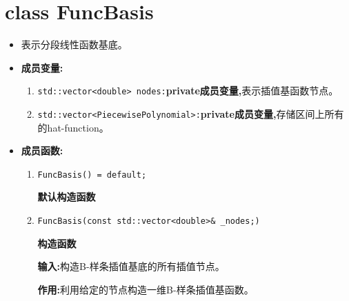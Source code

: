 \documentclass[UTF8]{ctexart}
\theoremstyle{plain}
\theoremstyle{definition}
\theoremstyle{remark}
\begin{document}
\section{class FuncBasis}
\begin{itemize}
    \item 表示分段线性函数基底。
    \item \textbf{成员变量:}
    \begin{enumerate}
        \item \texttt{std::vector<double> nodes:}\textbf{private成员变量,}表示插值基函数节点。
        
        \item \texttt{std::vector<PiecewisePolynomial>:}\textbf{private成员变量,}存储区间上所有的hat-function。
    \end{enumerate}
    \item \textbf{成员函数:}
    \begin{enumerate}
        \item \texttt{FuncBasis() = default;}
        
        \textbf{默认构造函数}

        \item \texttt{FuncBasis(const std::vector<double>\& \_nodes;)}
        
        \textbf{构造函数}

        \textbf{输入:}构造B-样条插值基底的所有插值节点。

        \textbf{作用:}利用给定的节点构造一维B-样条插值基函数。
    \end{enumerate}
\end{itemize}
\end{document}
